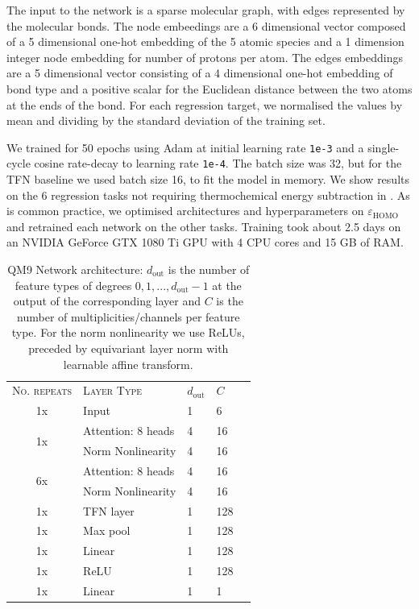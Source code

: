 The input to the network is a sparse molecular graph, with edges represented by the molecular bonds. The node embeedings are a 6 dimensional vector composed of a 5 dimensional one-hot embedding of the 5 atomic species and a 1 dimension integer node embedding for number of protons per atom. The edges embeddings are a 5 dimensional vector consisting of a 4 dimensional one-hot embedding of bond type and a positive scalar for the Euclidean distance between the two atoms at the ends of the bond. For each regression target, we normalised the values by mean and dividing by the standard deviation of the training set.

We trained for 50 epochs using Adam \cite{KingmaB14} at initial learning rate \texttt{1e-3} and a single-cycle cosine rate-decay to learning rate \texttt{1e-4}. The batch size was 32, but for the TFN baseline we used batch size 16, to fit the model in memory. We show results on the 6 regression tasks not requiring thermochemical energy subtraction in . As is common practice, we optimised architectures and hyperparameters on $\varepsilon_\text{HOMO}$ and retrained each network on the other tasks. Training took about 2.5 days on an NVIDIA GeForce GTX 1080 Ti GPU with 4 CPU cores and 15 GB of RAM. 

\begin{table}[h]
    \centering
    \caption{QM9 Network architecture: $d_\text{out}$ is the number of feature types of degrees $0,1,...,d_\text{out}-1$ at the output of the corresponding layer and $C$ is the number of multiplicities/channels per feature type. For the norm nonlinearity we use ReLUs, preceded by equivariant layer norm \cite{WeilerGWBC18} with learnable affine transform.}
    \label{tab:qm9_architecture}
    \begin{tabular}{cllll}
        \toprule
        \textsc{No. repeats} & \textsc{Layer Type} & $d_\text{out}$ & $C$\\
        1x & Input & 1 & 6 \\
        \midrule
        \multirow{2}{*}{1x}& Attention: 8 heads & 4 & 16 \\
        &Norm Nonlinearity & 4 & 16 \\
        \midrule
        \multirow{2}{*}{6x}& Attention: 8 heads & 4 & 16 \\
        &Norm Nonlinearity & 4 & 16 \\
        \midrule
        1x & TFN layer & 1 & 128 \\
        \midrule
        1x   & Max pool & 1 & 128 \\
        1x   & Linear &1 & 128\\
        1x   & ReLU & 1 & 128\\
        1x   & Linear &1 & 1 \\
        \bottomrule
    \end{tabular}
\end{table}

